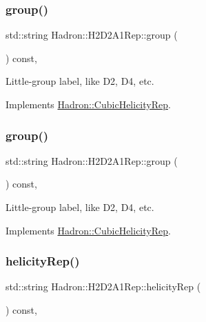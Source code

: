 \subsubsection{\texorpdfstring{group()}{group()}\hspace{0.1cm}{\footnotesize\ttfamily [2/3]}}
{\footnotesize\ttfamily std\+::string Hadron\+::\+H2\+D2\+A1\+Rep\+::group (\begin{DoxyParamCaption}{ }\end{DoxyParamCaption}) const\hspace{0.3cm}{\ttfamily [inline]}, {\ttfamily [virtual]}}

Little-\/group label, like D2, D4, etc. 

Implements \mbox{\hyperlink{structHadron_1_1CubicHelicityRep_a101a7d76cd8ccdad0f272db44b766113}{Hadron\+::\+Cubic\+Helicity\+Rep}}.

\mbox{\label{structHadron_1_1H2D2A1Rep_a8e1e801312be98b0f43fff8d5d61f0a4}} 
\subsubsection{\texorpdfstring{group()}{group()}\hspace{0.1cm}{\footnotesize\ttfamily [3/3]}}
{\footnotesize\ttfamily std\+::string Hadron\+::\+H2\+D2\+A1\+Rep\+::group (\begin{DoxyParamCaption}{ }\end{DoxyParamCaption}) const\hspace{0.3cm}{\ttfamily [inline]}, {\ttfamily [virtual]}}

Little-\/group label, like D2, D4, etc. 

Implements \mbox{\hyperlink{structHadron_1_1CubicHelicityRep_a101a7d76cd8ccdad0f272db44b766113}{Hadron\+::\+Cubic\+Helicity\+Rep}}.

\mbox{\label{structHadron_1_1H2D2A1Rep_a53e9f8aa22d8ccbeb585c9cf56440392}} 
\subsubsection{\texorpdfstring{helicityRep()}{helicityRep()}\hspace{0.1cm}{\footnotesize\ttfamily [1/2]}}
{\footnotesize\ttfamily std\+::string Hadron\+::\+H2\+D2\+A1\+Rep\+::helicity\+Rep (\begin{DoxyParamCaption}{ }\end{DoxyParamCaption}) const\hspace{0.3cm}{\ttfamily [inline]}, {\ttfamily [virtual]}}

